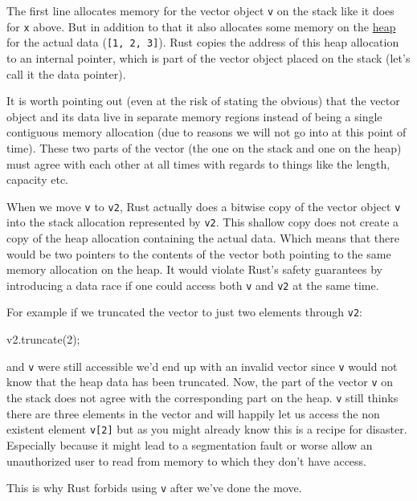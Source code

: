 \documentclass[a4paper,]{book}
\newenvironment{Shaded}{\begin{snugshade}}{\end{snugshade}}
\newcommand{\DecValTok}[1]{\textcolor[rgb]{0.00,0.00,0.81}{{#1}}}
\newcommand{\NormalTok}[1]{{#1}}
\begin{document}
The first line allocates memory for the vector object \texttt{v} on the
stack like it does for \texttt{x} above. But in addition to that it also
allocates some memory on the
\protect\hyperlink{sec--the-stack-and-the-heap}{heap} for the actual
data (\texttt{{[}1,\ 2,\ 3{]}}). Rust copies the address of this heap
allocation to an internal pointer, which is part of the vector object
placed on the stack (let's call it the data pointer).

It is worth pointing out (even at the risk of stating the obvious) that
the vector object and its data live in separate memory regions instead
of being a single contiguous memory allocation (due to reasons we will
not go into at this point of time). These two parts of the vector (the
one on the stack and one on the heap) must agree with each other at all
times with regards to things like the length, capacity etc.

When we move \texttt{v} to \texttt{v2}, Rust actually does a bitwise
copy of the vector object \texttt{v} into the stack allocation
represented by \texttt{v2}. This shallow copy does not create a copy of
the heap allocation containing the actual data. Which means that there
would be two pointers to the contents of the vector both pointing to the
same memory allocation on the heap. It would violate Rust's safety
guarantees by introducing a data race if one could access both
\texttt{v} and \texttt{v2} at the same time.

For example if we truncated the vector to just two elements through
\texttt{v2}:

\begin{Shaded}
\begin{Highlighting}[]
\NormalTok{v2.truncate(}\DecValTok{2}\NormalTok{);}
\end{Highlighting}
\end{Shaded}

and \texttt{v} were still accessible we'd end up with an invalid vector
since \texttt{v} would not know that the heap data has been truncated.
Now, the part of the vector \texttt{v} on the stack does not agree with
the corresponding part on the heap. \texttt{v} still thinks there are
three elements in the vector and will happily let us access the non
existent element \texttt{v{[}2{]}} but as you might already know this is
a recipe for disaster. Especially because it might lead to a
segmentation fault or worse allow an unauthorized user to read from
memory to which they don't have access.

This is why Rust forbids using \texttt{v} after we've done the move.
\end{document}
